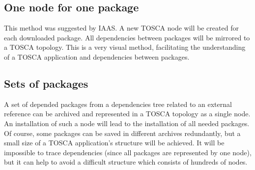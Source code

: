 \subsection*{One node for one package}
This method was suggested by IAAS. 
A new TOSCA node will be created for each downloaded package. 
All dependencies between packages will be mirrored to a TOSCA topology.
This is a very visual method, facilitating the understanding of a TOSCA application and dependencies between packages.

\subsection*{Sets of packages}
A set of depended packages from a dependencies tree related to an external reference can be archived and represented in a TOSCA topology as a single node.
An installation of such a node will lead to the installation of all needed packages.
Of course, some packages can be saved in different archives redundantly, but a small size of a TOSCA application's structure will be achieved.
It will be impossible to trace dependencies (since all packages are represented by one node), but it can help to avoid a difficult structure which consists of hundreds of nodes. 
